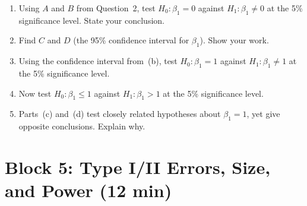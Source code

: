 \documentclass[11pt,a4paper]{article}
\begin{document}
\begin{enumerate}[label=(\alph*)]
\item Using $A$ and $B$ from Question~2, test $H_0\colon \beta_1 = 0$ against $H_1\colon \beta_1 \ne 0$ at the 5\% significance level. State your conclusion.

\begin{answerbox}
\vspace{4cm}
\end{answerbox}

\item Find $C$ and $D$ (the 95\% confidence interval for $\beta_1$). Show your work.

\begin{answerbox}
\vspace{4cm}
\end{answerbox}

\newpage
\item Using the confidence interval from~(b), test $H_0\colon \beta_1 = 1$ against $H_1\colon \beta_1 \ne 1$ at the 5\% significance level.

\begin{answerbox}
\vspace{4cm}
\end{answerbox}

\item Now test $H_0\colon \beta_1 \le 1$ against $H_1\colon \beta_1 > 1$ at the 5\% significance level.

\begin{answerbox}
\vspace{5cm}
\end{answerbox}

\item Parts~(c) and~(d) test closely related hypotheses about $\beta_1 = 1$, yet give opposite conclusions. Explain why.

\begin{answerbox}
\vspace{5cm}
\end{answerbox}

\end{enumerate}

\section{Block 5: Type I/II Errors, Size, and Power \textnormal{(12 min)}}
\end{document}
